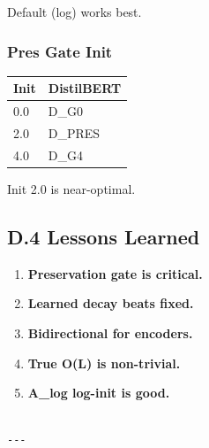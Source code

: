 Default (log) works best.

\subsubsection{Pres Gate Init}

\begin{table}[H]
\centering
\small
\begin{tabular}{ll}
\toprule
\textbf{Init} & \textbf{DistilBERT} \\
\midrule
0.0 & {{D\_G0}} \\
2.0 & {{D\_PRES}} \\
4.0 & {{D\_G4}} \\
\bottomrule
\end{tabular}
\end{table}

Init 2.0 is near-optimal.

\subsection{D.4 Lessons Learned}

\begin{enumerate}
\item \textbf{Preservation gate is critical.}
\item \textbf{Learned decay beats fixed.}
\item \textbf{Bidirectional for encoders.}
\item \textbf{True O(L) is non-trivial.}
\item \textbf{A\_log log-init is good.}
\end{enumerate}
\begin{lstlisting}

---
\end{lstlisting}
